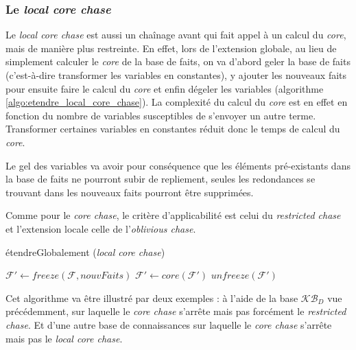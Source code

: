 \subsubsection{Le \textit{local core chase}}\label{sec:local_core_chase}

Le \textit{local core chase} est aussi un chaînage avant qui fait appel à un calcul du \textit{core}, mais de manière plus restreinte. En effet, lors de l'extension globale, au lieu de simplement calculer le \textit{core} de la base de faits, on va d'abord geler la base de faits (c'est-à-dire transformer les variables en constantes), y ajouter les nouveaux faits pour ensuite faire le calcul du \textit{core} et enfin dégeler les variables (algorithme \ref{algo:etendre_local_core_chase}). La complexité du calcul du \textit{core} est en effet en fonction du nombre de variables susceptibles de s'envoyer un autre terme. Transformer certaines variables en constantes réduit donc le temps de calcul du \textit{core}.
\par Le gel des variables va avoir pour conséquence que les éléments pré-existants dans la base de faits ne pourront subir de repliement, seules les redondances se trouvant dans les nouveaux faits pourront être supprimées.
\par Comme pour le \textit{core chase}, le critère d'applicabilité est celui du \textit{restricted chase} et l'extension locale celle de l'\textit{oblivious chase}.
\begin{algorithm}[!h]\label{algo:etendre_local_core_chase}
\caption{étendreGlobalement (\textit{local core chase})}
\SetAlgoLined
\DontPrintSemicolon
\SetAlgoLined
\DontPrintSemicolon
{}
	$\mathcal{F'} \gets freeze(\mathcal{F}, nouvFaits)$\;
    $\mathcal{F'} \gets core(\mathcal{F'})$\;
    \Return $unfreeze(\mathcal{F'})$
\end{algorithm}
\par Cet algorithme va être illustré par deux exemples : à l'aide de la base $\mathcal{KB}_D$ vue précédemment, sur laquelle le \textit{core chase} s'arrête mais pas forcément le \textit{restricted chase}. Et d'une autre base de connaissances sur laquelle le \textit{core chase} s'arrête mais pas le \textit{local core chase}.


